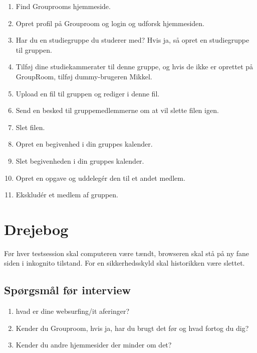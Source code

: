 \documentclass[12pt]{article}
\begin{document}
\begin{enumerate}
\item Find Grouprooms hjemmeside.
\item Opret profil på Grouproom og login og udforsk hjemmesiden.
\item Har du en studiegruppe du studerer med? Hvis ja, så opret en studiegruppe til gruppen.
\item Tilføj dine studiekammerater til denne gruppe, og hvis de ikke er oprettet på GroupRoom, tilføj dummy-brugeren Mikkel.
\item Upload en fil til gruppen og rediger i denne fil.
\item Send en besked til gruppemedlemmerne om at vil slette filen igen.
\item Slet filen.
\item Opret en begivenhed i din gruppes kalender.
\item Slet begivenheden i din gruppes kalender.
\item Opret en opgave og uddelegér den til et andet medlem.
\item Ekskludér et medlem af gruppen.
\end{enumerate}

\section{Drejebog}
Før hver testsession skal computeren være tændt, browseren skal stå på ny fane siden i inkognito tilstand. For en sikkerhedsskyld skal historikken være slettet.

\subsection{Spørgsmål før interview}
\begin{enumerate}
  \item hvad er dine websurfing/it aferinger?
  \item Kender du Grouproom, hvis ja, har du brugt det før og hvad fortog du dig?
  \item Kender du andre hjemmesider der minder om det?
\end{enumerate}
\end{document}

